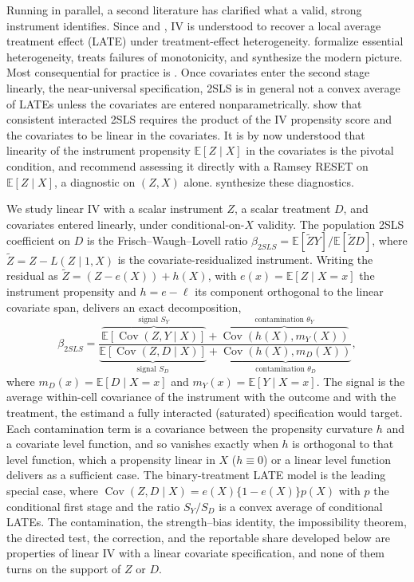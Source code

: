 \documentclass[preprint,11pt,authoryear]{elsarticle}
\theoremstyle{definition}
\newcommand{\E}{\mathbb{E}}
\newcommand{\Cov}{\operatorname{Cov}}
\newcommand{\Ztil}{\tilde{Z}}
\begin{document}
Running in parallel, a second literature has clarified what a valid, strong
instrument identifies. Since \citet{imbens1994} and \citet{angrist1996}, IV is
understood to recover a local average treatment effect (LATE) under treatment-effect
heterogeneity. \citet{heckman2005} formalize essential heterogeneity,
\citet{dechaisemartin2017} treats failures of monotonicity, and
\citet{mogstad2018,mogstad2024} synthesize the modern picture. Most consequential for
practice is \citet{blandhol2022}. Once covariates enter the second stage
linearly, the near-universal specification, 2SLS is in general not a
convex average of LATEs unless the covariates are entered nonparametrically.
\citet{ddl2025} show that consistent interacted
2SLS requires the product of the IV propensity score and the covariates to be linear
in the covariates. It is by now understood that linearity of the instrument propensity
$\E[Z\mid X]$ in the covariates is the pivotal condition, and \citet{blandhol2022}
recommend assessing it directly with a Ramsey RESET on $\E[Z\mid X]$, a diagnostic on
$(Z,X)$ alone. \citet{ssu2026} synthesize these diagnostics.

We study linear IV with a scalar instrument $Z$, a
scalar treatment $D$, and covariates entered linearly, under conditional-on-$X$
validity. The population 2SLS coefficient on $D$ is the Frisch--Waugh--Lovell ratio
$\beta_{2SLS}=\E[\Ztil Y]/\E[\Ztil D]$, where $\Ztil=Z-L(Z\mid1,X)$ is the
covariate-residualized instrument. Writing the residual as $\Ztil=(Z-e(X))+h(X)$, with
$e(x)=\E[Z\mid X=x]$ the instrument propensity and $h=e-\ell$ its component orthogonal
to the linear covariate span, delivers an exact decomposition,
\begin{equation}\label{eq:introdecomp}
\beta_{2SLS}
=\frac{\overbrace{\E[\Cov(Z,Y\mid X)]}^{\text{signal }S_Y}+\overbrace{\Cov(h(X),m_Y(X))}^{\text{contamination }\theta_Y}}
      {\underbrace{\E[\Cov(Z,D\mid X)]}_{\text{signal }S_D}+\underbrace{\Cov(h(X),m_D(X))}_{\text{contamination }\theta_D}},
\end{equation}
where $m_D(x)=\E[D\mid X=x]$ and $m_Y(x)=\E[Y\mid X=x]$. The signal is the average within-cell covariance of the instrument with the outcome and with the treatment, the estimand a fully interacted (saturated) specification would target. Each
contamination term is a covariance between the propensity curvature $h$ and a covariate
level function, and so vanishes exactly when $h$ is orthogonal to that level function,
which a propensity linear in $X$ ($h\equiv0$) or a linear level function delivers as a
sufficient case. The binary-treatment LATE model is the leading special case, where
$\Cov(Z,D\mid X)=e(X)\{1-e(X)\}p(X)$ with $p$ the conditional first stage and the ratio
$S_Y/S_D$ is a convex average of conditional LATEs. The contamination, the
strength--bias identity, the impossibility theorem, the directed test, the correction,
and the reportable share developed below are properties of linear IV with a linear
covariate specification, and none of them turns on the support of $Z$ or $D$.
\end{document}
